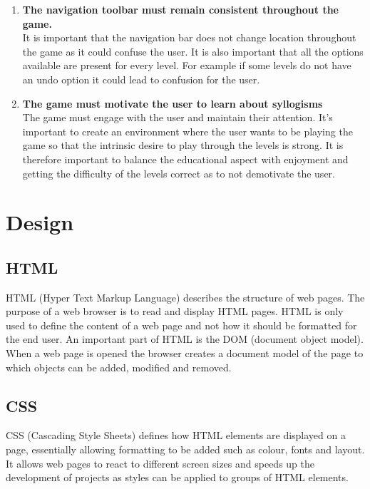 \documentclass[12pt,a4paper]{report}
\begin{document}
\begin{enumerate}[label*=\arabic*]
                                      \item \textbf{The navigation toolbar must remain consistent throughout the game.
                                      }\\
It is important that the navigation bar does not change location throughout the game as it could confuse the user. It is also important that all the options available are present for every level. For example if some levels do not have an undo option it could lead to confusion for the user.

                                      \item \textbf{The game must motivate the user to learn about syllogisms
}\\
The game must engage with the user and maintain their attention. It's important to create an environment where the user wants to be playing the game so that the intrinsic desire to play through the levels is strong. It is therefore important to balance the educational aspect with enjoyment and getting the difficulty of the levels correct as to not demotivate the user.
            \end{enumerate}
            
\chapter{Design}

\section{HTML}
HTML (Hyper Text Markup Language) describes the structure of web pages. The purpose of a web browser is to read and display HTML pages. HTML is only used to define the content of a web page and not how it should be formatted for the end user.
An important part of HTML is the DOM (document object model). When a web page is opened the browser creates a document model of the page to which objects can be added, modified and removed.

\section{CSS}
CSS (Cascading Style Sheets) defines how HTML elements are displayed on a page, essentially allowing formatting to be added such as colour, fonts and layout. It allows web pages to react to different screen sizes and speeds up the development of projects as styles can be applied to groups of HTML elements. 
\end{document}
